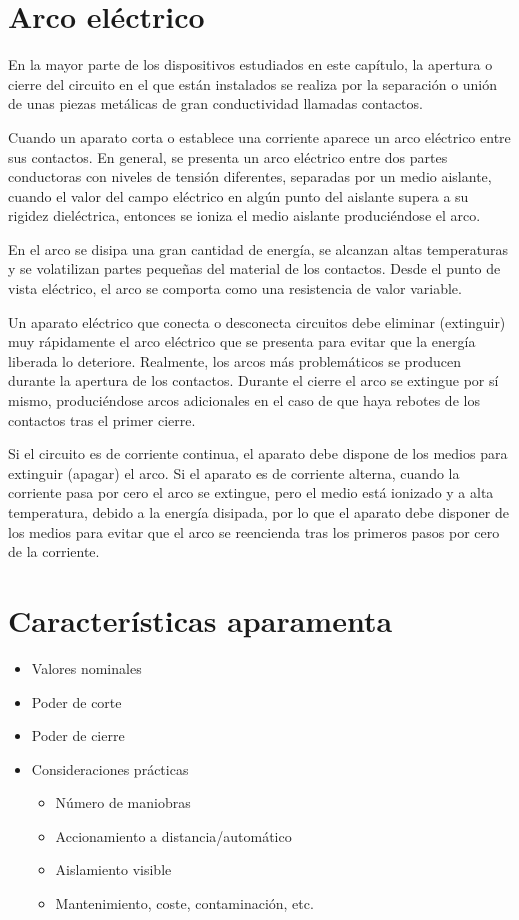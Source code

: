 \section{Arco eléctrico}
En la mayor parte de los dispositivos estudiados en este capítulo, la apertura o cierre del circuito en el que están instalados se realiza por la separación o unión de unas piezas metálicas de gran conductividad llamadas contactos.

Cuando un aparato corta o establece una corriente aparece un arco eléctrico entre sus contactos. En general, se presenta un arco eléctrico entre dos partes conductoras con niveles de tensión diferentes, separadas por un medio aislante, cuando el valor del campo eléctrico en algún punto del aislante supera a su rigidez dieléctrica, entonces se ioniza el medio aislante produciéndose el arco.

En el arco se disipa una gran cantidad de energía, se alcanzan altas temperaturas y se volatilizan partes pequeñas del material de los contactos. Desde el punto de vista eléctrico, el arco se comporta como una resistencia de valor variable.

Un aparato eléctrico que conecta o desconecta circuitos debe eliminar (extinguir) muy rápidamente el arco eléctrico que se presenta para evitar que la energía liberada lo deteriore. Realmente, los arcos más problemáticos se producen durante la apertura de los contactos. Durante el cierre el arco se extingue por sí mismo, produciéndose arcos adicionales en el caso de que haya rebotes de los contactos tras el primer cierre.

Si el circuito es de corriente continua, el aparato debe dispone de los medios para extinguir (apagar) el arco. Si el aparato es de corriente alterna, cuando la corriente pasa por cero el arco se extingue, pero el medio está ionizado y a alta temperatura, debido a la energía disipada, por lo que el aparato debe disponer de los medios para evitar que el arco se reencienda tras los primeros pasos por cero de la corriente.

\section{Características aparamenta}
\begin{itemize}
    \item Valores nominales
    \item Poder de corte
    \item Poder de cierre
    \item Consideraciones prácticas
    \begin{itemize}
        \item Número de maniobras
        \item Accionamiento a distancia/automático
        \item Aislamiento visible
        \item Mantenimiento, coste, contaminación, etc.
    \end{itemize}
\end{itemize}

